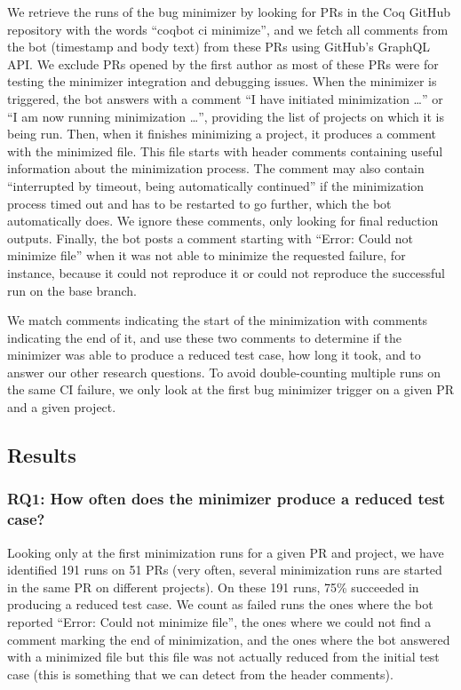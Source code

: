 \documentclass[a4paper,USenglish,cleveref,autoref,thm-restate]{lipics-v2021}
\begin{document}
We retrieve the runs of the bug minimizer by looking for PRs in the Coq GitHub repository with the words ``coqbot ci minimize'', and we fetch all comments from the bot (timestamp and body text) from these PRs using GitHub's GraphQL API.
We exclude PRs opened by the first author as most of these PRs were for testing the minimizer integration and debugging issues.
When the minimizer is triggered, the bot answers with a comment ``I have initiated minimization \ldots'' or ``I am now running minimization \ldots'', providing the list of projects on which it is being run.
%
Then, when it finishes minimizing a project, it produces a comment with the minimized file.
%
This file starts with header comments containing useful information about the minimization process. %
%
The comment may also contain ``interrupted by timeout, being automatically continued'' if the minimization process timed out and has to be restarted to go further, which the bot automatically does.
%
We ignore these comments, only looking for final reduction outputs.
%
Finally, the bot posts a comment starting with ``Error: Could not minimize file'' when it was not able to minimize the requested failure, for instance, because it could not reproduce it or could not reproduce the successful run on the base branch.

We match comments indicating the start of the minimization with comments indicating the end of it, and use these two comments to determine if the minimizer was able to produce a reduced test case, how long it took, and to answer our other research questions.
To avoid double-counting multiple runs on the same CI failure, we only look at the first bug minimizer trigger on a given PR and a given project.

\subsection{Results}

\subsubsection{RQ1: How often does the minimizer produce a reduced test case?}

Looking only at the first minimization runs for a given PR and project, we have identified 191 runs on 51 PRs (very often, several minimization runs are started in the same PR on different projects).
On these 191 runs, 75\% succeeded in producing a reduced test case. We count as failed runs the ones where the bot reported ``Error: Could not minimize file'', the ones where we could not find a comment marking the end of minimization, and the ones where the bot answered with a minimized file but this file was not actually reduced from the initial test case (this is something that we can detect from the header comments).
\end{document}
